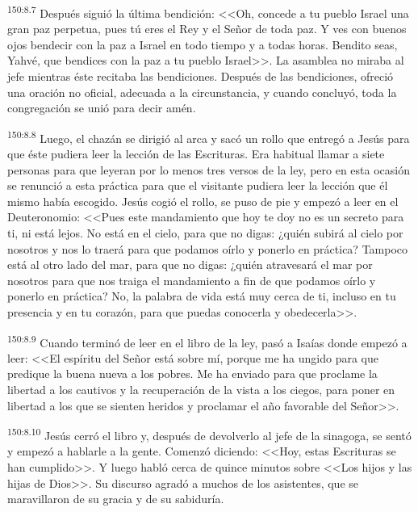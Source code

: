 \par 
\textsuperscript{150:8.7} Después siguió la última bendición: <<Oh, concede a tu pueblo Israel una gran paz perpetua, pues tú eres el Rey y el Señor de toda paz. Y ves con buenos ojos bendecir con la paz a Israel en todo tiempo y a todas horas. Bendito seas, Yahvé, que bendices con la paz a tu pueblo Israel>>. La asamblea no miraba al jefe mientras éste recitaba las bendiciones. Después de las bendiciones, ofreció una oración no oficial, adecuada a la circunstancia, y cuando concluyó, toda la congregación se unió para decir amén.

\par 
\textsuperscript{150:8.8} Luego, el chazán se dirigió al arca y sacó un rollo que entregó a Jesús para que éste pudiera leer la lección de las Escrituras. Era habitual llamar a siete personas para que leyeran por lo menos tres versos de la ley, pero en esta ocasión se renunció a esta práctica para que el visitante pudiera leer la lección que él mismo había escogido. Jesús cogió el rollo, se puso de pie y empezó a leer en el Deuteronomio: <<Pues este mandamiento que hoy te doy no es un secreto para ti, ni está lejos. No está en el cielo, para que no digas: ¿quién subirá al cielo por nosotros y nos lo traerá para que podamos oírlo y ponerlo en práctica? Tampoco está al otro lado del mar, para que no digas: ¿quién atravesará el mar por nosotros para que nos traiga el mandamiento a fin de que podamos oírlo y ponerlo en práctica? No, la palabra de vida está muy cerca de ti, incluso en tu presencia y en tu corazón, para que puedas conocerla y obedecerla>>.

\par 
\textsuperscript{150:8.9} Cuando terminó de leer en el libro de la ley, pasó a Isaías donde empezó a leer: <<El espíritu del Señor está sobre mí, porque me ha ungido para que predique la buena nueva a los pobres. Me ha enviado para que proclame la libertad a los cautivos y la recuperación de la vista a los ciegos, para poner en libertad a los que se sienten heridos y proclamar el año favorable del Señor>>.

\par 
\textsuperscript{150:8.10} Jesús cerró el libro y, después de devolverlo al jefe de la sinagoga, se sentó y empezó a hablarle a la gente. Comenzó diciendo: <<Hoy, estas Escrituras se han cumplido>>. Y luego habló cerca de quince minutos sobre <<Los hijos y las hijas de Dios>>. Su discurso agradó a muchos de los asistentes, que se maravillaron de su gracia y de su sabiduría.

